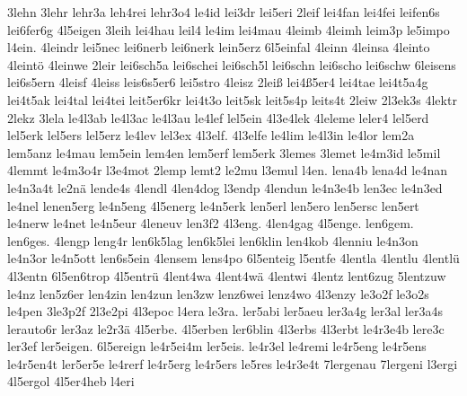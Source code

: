 {    3lehn
    3lehr
    lehr3a
    leh4rei
    lehr3o4
    le4id
    lei3dr
    lei5eri
    2leif
    lei4fan
    lei4fei
    leifen6s
    lei6fer6g
    4l5eigen
    3leih
    lei4hau
    leil4
    le4im
    lei4mau
    4leimb
    4leimh
    leim3p
    le5impo
    l4ein.
    4leindr
    lei5nec
    lei6nerb
    lei6nerk
    lein5erz
    6l5einfal
    4leinn
    4leinsa
    4leinto
    4leintö
    4leinwe
    2leir
    lei6sch5a
    lei6schei
    lei6sch5l
    lei6schn
    lei6scho
    lei6schw
    6leisens
    lei6s5ern
    4leisf
    4leiss
    leis6s5er6
    lei5stro
    4leisz
    2leiß
    lei4ß5er4
    lei4tae
    lei4t5a4g
    lei4t5ak
    lei4tal
    lei4tei
    leit5er6kr
    lei4t3o
    leit5sk
    leit5s4p
    leits4t
    2leiw
    2l3ek3s
    4lektr
    2lekz
    3lela
    le4l3ab
    le4l3ac
    le4l3au
    le4lef
    lel5ein
    4l3e4lek
    4leleme
    leler4
    lel5erd
    lel5erk
    lel5ers
    lel5erz
    le4lev
    lel3ex
    4l3elf.
    4l3elfe
    le4lim
    le4l3in
    le4lor
    lem2a
    lem5anz
    le4mau
    lem5ein
    lem4en
    lem5erf
    lem5erk
    3lemes
    3lemet
    le4m3id
    le5mil
    4lemmt
    le4m3o4r
    l3e4mot
    2lemp
    lemt2
    le2mu
    l3emul
    l4en.
    lena4b
    lena4d
    le4nan
    le4n3a4t
    le2nä
    lende4s
    4lendl
    4len4dog
    l3endp
    4lendun
    le4n3e4b
    len3ec
    le4n3ed
    le4nel
    lenen5erg
    le4n5eng
    4l5energ
    le4n5erk
    len5erl
    len5ero
    len5ersc
    len5ert
    le4nerw
    le4net
    le4n5eur
    4leneuv
    len3f2
    4l3eng.
    4len4gag
    4l5enge.
    len6gem.
    len6ges.
    4lengp
    leng4r
    len6k5lag
    len6k5lei
    len6klin
    len4kob
    4lenniu
    le4n3on
    le4n3or
    le4n5ott
    len6s5ein
    4lensem
    lens4po
    6l5enteig
    l5entfe
    4lentla
    4lentlu
    4lentlü
    4l3entn
    6l5en6trop
    4l5entrü
    4lent4wa
    4lent4wä
    4lentwi
    4lentz
    lent6zug
    5lentzuw
    le4nz
    len5z6er
    len4zin
    len4zun
    len3zw
    lenz6wei
    lenz4wo
    4l3enzy
    le3o2f
    le3o2s
    le4pen
    3le3p2f
    2l3e2pi
    4l3epoc
    l4era
    le3ra.
    ler5abi
    ler5aeu
    ler3a4g
    ler3al
    ler3a4s
    lerauto6r
    ler3az
    le2r3ä
    4l5erbe.
    4l5erben
    ler6blin
    4l3erbs
    4l3erbt
    le4r3e4b
    lere3c
    ler3ef
    ler5eigen.
    6l5ereign
    le4r5ei4m
    ler5eis.
    le4r3el
    le4remi
    le4r5eng
    le4r5ens
    le4r5en4t
    ler5er5e
    le4rerf
    le4r5erg
    le4r5ers
    le5res
    le4r3e4t
    7lergenau
    7lergeni
    l3ergi
    4l5ergol
    4l5er4heb
    l4eri
}

